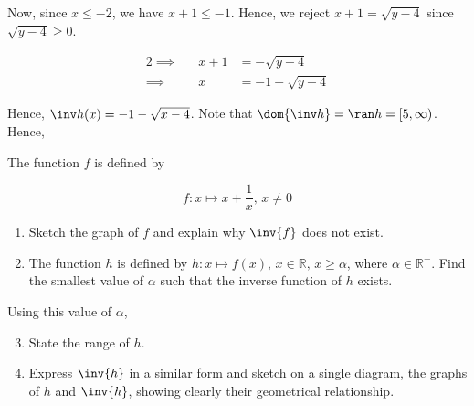 \documentclass{jhwhw}
\begin{document}
            Now, since $x \leq -2$, we have $x+1 \leq -1$. Hence, we reject $x + 1 = \sqrt{y-4}$ since $\sqrt{y-4} \geq 0$.

            \begin{alignat*}{2}
                \implies&&x + 1 &= -\sqrt{y-4}\\
                \implies&& x &= -1-\sqrt{y-4}
            \end{alignat*}

            Hence, $\inv h(x) = -1 -\sqrt{x-4}$. Note that $\dom{\inv h} = \ran h = [5, \infty)$. Hence,


    \problem{}
        The function $f$ is defined by

        \begin{equation*}
            f \colon x \mapsto x + \dfrac1{x}, \, x \neq 0
        \end{equation*}

        \begin{enumerate}
            \item Sketch the graph of $f$ and explain why $\inv{f}$ does not exist.
            \item The function $h$ is defined by $h \colon x \mapsto f(x), \, x \in \mathbb{R}, \, x \geq \alpha$, where $\alpha \in \mathbb{R}^+$. Find the smallest value of $\alpha$ such that the inverse function of $h$ exists.
        \end{enumerate}

        \noindent Using this value of $\alpha$,
        
        \begin{enumerate}
            \setcounter{enumi}{2}
            \item State the range of $h$.
            \item Express $\inv{h}$ in a similar form and sketch on a single diagram, the graphs of $h$ and $\inv{h}$, showing clearly their geometrical relationship.
        \end{enumerate}

    \solution
\end{document}
